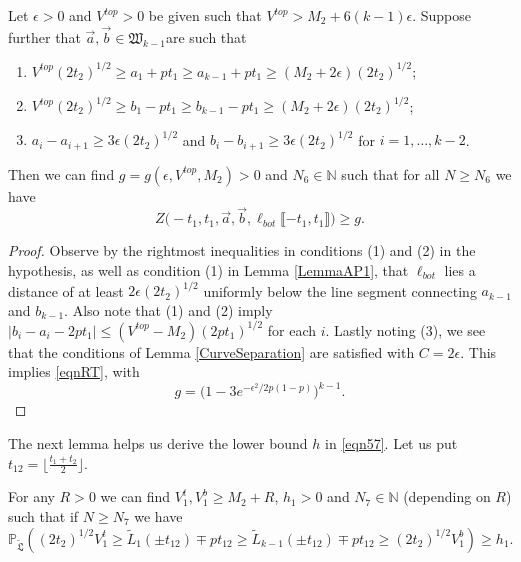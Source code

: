 \begin{lemma}\label{LemmaBP1} Let $\epsilon > 0$ and $V^{top} > 0$ be given such that $V^{top} > M_2 + 6 (k-1) \epsilon$. Suppose further that $\vec{a}, \vec{b} \in \mathfrak{W}_{k-1}$are such that 
	\begin{enumerate}
		\item $V^{top} (2t_2)^{1/2} \geq a_1 + p t_1 \geq a_{k-1} + pt_1 \geq (M_2 + 2 \epsilon) (2t_2)^{1/2}$;
		\item $V^{top} (2t_2)^{1/2} \geq b_1 - p t_1 \geq b_{k-1} - pt_1 \geq (M_2 + 2 \epsilon) (2t_2)^{1/2}$; 
		\item $a_i -a_{i+1} \geq 3\epsilon (2t_2)^{1/2}$ and $b_{i} - b_{i+1} \geq 3 \epsilon (2t_2)^{1/2}$ for $i = 1, \dots, k-2$.
	\end{enumerate}
	Then we can find $g = g(\epsilon, V^{top}, M_2) > 0$ and $N_6 \in \mathbb{N}$ such that for all $N \geq N_6$ we have 
	\begin{equation}\label{eqnRT}
	Z\big(  -t_1, t_1, \vec{a} ,\vec{b}, \ell_{bot}\llbracket -t_1, t_1\rrbracket\big) \geq g.
	\end{equation}
\end{lemma}

\begin{proof}
	
	Observe by the rightmost inequalities in conditions (1) and (2) in the hypothesis, as well as condition (1) in Lemma \ref{LemmaAP1}, that $\ell_{bot}$ lies a distance of at least $2\epsilon(2t_2)^{1/2}$ uniformly below the line segment connecting $a_{k-1}$ and $b_{k-1}$. Also note that (1) and (2) imply $|b_i-a_i-2pt_1| \leq (V^{top} - M_2)(2pt_1)^{1/2}$ for each $i$. Lastly noting (3), we see that the conditions of Lemma \ref{CurveSeparation} are satisfied with $C = 2\epsilon$. This implies \eqref{eqnRT}, with
	\[
	g = \big(1 - 3e^{-\epsilon^2/2p(1-p)}\big)^{k-1}.
	\]
	
\end{proof}

The next lemma helps us derive the lower bound $h$ in \eqref{eqn57}. Let us put $t_{12} = \lfloor \frac{t_1 + t_2}{2} \rfloor$.

\begin{lemma}\label{LemmaBP2} For any $R > 0$ we can find $V_1^t, V_1^b \geq M_2 + R$, $h_1 > 0$ and $N_7 \in \mathbb{N}$ (depending on $R$) such that if $N \geq N_7$ we have
	\begin{equation}\label{eqnRT2}
	\mathbb{P}_{\tilde{\mathfrak{L}}} \left(  (2t_2)^{1/2} V_1^t \geq \tilde{L}_1(\pm t_{12}) \mp p t_{12} \geq \tilde{L}_{k-1}(\pm t_{12}) \mp p t_{12} \geq (2t_2)^{1/2} V_1^b  \right) \geq h_1.
	\end{equation}
	
\end{lemma}

